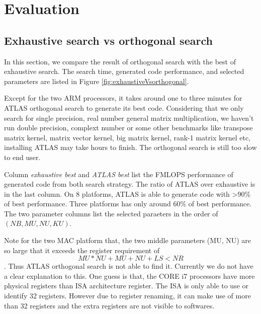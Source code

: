 \section{Evaluation}
\label{sec:evaluation}

  \subsection{Exhaustive search vs \atl orthogonal search}
  \label{sec:exhaustiveVSorthogonal}
    In this section, we compare the result of \atl orthogonal search with the best of exhaustive
    search. The search time, generated code performance, and selected parameters are listed in Figure
    \ref{fig:exhaustiveVsorthogonal}.\par
    Except for the two ARM processors, it takes around one to three minutes for ATLAS orthogonal search 
    to generate its best code. Considering that we only search for single precision, real number general 
    matrix multiplication, we haven't run double precision, complext number or some other benchmarks 
    like transpose matrix kernel, matrix vector kernel, big matrix kernel, rank-1 matrix kernel etc, installing 
    ATLAS may take hours to finish. The orthogonal search is still too slow to end user.\par
    Column \textit{exhaustive best} and \textit{ATLAS best} list the FMLOPS performance of generated code from
    both search strategy. The ratio of ATLAS over exhaustive is in the last column. On 8 platforms, 
    ATLAS is able to generate code with >90\% of best performance. Three platforms has only around 60\% of 
    best performance. The two parameter columns list the selected paraeters in the order of $(NB, MU, NU, KU)$.\par
    Note for the two MAC platform that, the two middle parameters (MU, NU) are so large that it exceeds 
    the register requirement of \[ MU*NU + MU + NU + LS < NR \]. Thus ATLAS orthogonal search is not able 
    to find it. Currently we do not have a clear explanation to this. One guess is that, the CORE i7 processors
    have more physical registers than ISA architecture register. The ISA is only able to use or identify 32 registers.
    However due to register renaming, it can make use of more than 32 registers and the extra registers are not visible 
    to softwares.\par
     



